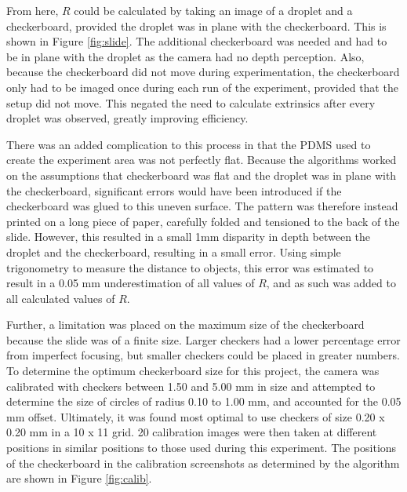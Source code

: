 \documentclass{physics_article_B}
\begin{document}
            From here, $R$ could be calculated by taking an image of a droplet and a checkerboard, provided the droplet was in plane with the checkerboard. This is shown in Figure \ref{fig:slide}. The additional checkerboard was needed and had to be in plane with the droplet as the camera had no depth perception. Also, because the checkerboard did not move during experimentation, the checkerboard only had to be imaged once during each run of the experiment, provided that the setup did not move. This negated the need to calculate extrinsics after every droplet was observed, greatly improving efficiency. 
            
            There was an added complication to this process in that the PDMS used to create the experiment area was not perfectly flat. Because the algorithms worked on the assumptions that checkerboard was flat and the droplet was in plane with the checkerboard, significant errors would have been introduced if the checkerboard was glued to this uneven surface. The pattern was therefore instead printed on a long piece of paper, carefully folded and tensioned to the back of the slide. However, this resulted in a small 1mm disparity in depth between the droplet and the checkerboard, resulting in a small error. Using simple trigonometry to measure the distance to objects, this error was estimated to result in a 0.05 mm underestimation of all values of $R$, and as such was added to all calculated values of $R$. 
            
            Further, a limitation was placed on the maximum size of the checkerboard because the slide was of a finite size. Larger checkers had a lower percentage error from imperfect focusing, but smaller checkers could be placed in greater numbers. To determine the optimum checkerboard size for this project, the camera was calibrated with checkers between 1.50 and 5.00 mm in size and attempted to determine the size of circles of radius 0.10 to 1.00 mm, and accounted for the 0.05 mm offset. Ultimately, it was found most optimal to use checkers of size 0.20 x 0.20 mm in a 10 x 11 grid. 20 calibration images were then taken at different positions in similar positions to those used during this experiment. The positions of the checkerboard in the calibration screenshots as determined by the algorithm are shown in Figure \ref{fig:calib}. 
            
\end{document}
